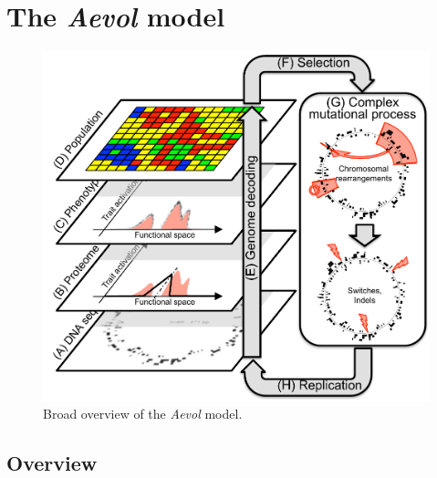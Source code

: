 \section{The \emph{Aevol} model}
\label{sec:aevol:model}

\begin{figure}[H]
\includegraphics[width=\textwidth]{aevol/images/aevol.pdf}
\caption[Overview of the \emph{Aevol} model]{Broad overview of the \emph{Aevol} model.}
\label{fig:aevol:model}
\end{figure}

\subsection{Overview}

